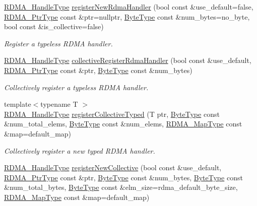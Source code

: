 \begin{DoxyCompactItemize}
\hyperlink{namespacevt_a10442579ec4e7ebef223818e64bcf908}{R\+D\+M\+A\+\_\+\+Handle\+Type} \hyperlink{structvt_1_1rdma_1_1_r_d_m_a_manager_ab68308f4b3b72714f81a00755736b0b5}{register\+New\+Rdma\+Handler} (bool const \&use\+\_\+default=false, \hyperlink{namespacevt_a9e2c953286c7616f7c218e9951790776}{R\+D\+M\+A\+\_\+\+Ptr\+Type} const \&ptr=nullptr, \hyperlink{namespacevt_aab8d55968084610ce3b17057981e9300}{Byte\+Type} const \&num\+\_\+bytes=no\+\_\+byte, bool const \&is\+\_\+collective=false)
\begin{DoxyCompactList}\small\item\em Register a typeless R\+D\+MA handler. \end{DoxyCompactList}\item 
\hyperlink{namespacevt_a10442579ec4e7ebef223818e64bcf908}{R\+D\+M\+A\+\_\+\+Handle\+Type} \hyperlink{structvt_1_1rdma_1_1_r_d_m_a_manager_a526b7c441125a9d5ed9528736be97819}{collective\+Register\+Rdma\+Handler} (bool const \&use\+\_\+default, \hyperlink{namespacevt_a9e2c953286c7616f7c218e9951790776}{R\+D\+M\+A\+\_\+\+Ptr\+Type} const \&ptr, \hyperlink{namespacevt_aab8d55968084610ce3b17057981e9300}{Byte\+Type} const \&num\+\_\+bytes)
\begin{DoxyCompactList}\small\item\em Collectively register a typeless R\+D\+MA handler. \end{DoxyCompactList}\item 
{\footnotesize template$<$typename T $>$ }\\\hyperlink{namespacevt_a10442579ec4e7ebef223818e64bcf908}{R\+D\+M\+A\+\_\+\+Handle\+Type} \hyperlink{structvt_1_1rdma_1_1_r_d_m_a_manager_ad851bdc250182163eb4996888ba1b863}{register\+Collective\+Typed} (T ptr, \hyperlink{namespacevt_aab8d55968084610ce3b17057981e9300}{Byte\+Type} const \&num\+\_\+total\+\_\+elems, \hyperlink{namespacevt_aab8d55968084610ce3b17057981e9300}{Byte\+Type} const \&num\+\_\+elems, \hyperlink{structvt_1_1rdma_1_1_r_d_m_a_manager_a16e12d11cf7d771df0d3dc6947a4f95c}{R\+D\+M\+A\+\_\+\+Map\+Type} const \&map=default\+\_\+map)
\begin{DoxyCompactList}\small\item\em Collectively register a new typed R\+D\+MA handler. \end{DoxyCompactList}\item 
\hyperlink{namespacevt_a10442579ec4e7ebef223818e64bcf908}{R\+D\+M\+A\+\_\+\+Handle\+Type} \hyperlink{structvt_1_1rdma_1_1_r_d_m_a_manager_a339763a690f218c3df58268a691ecfe4}{register\+New\+Collective} (bool const \&use\+\_\+default, \hyperlink{namespacevt_a9e2c953286c7616f7c218e9951790776}{R\+D\+M\+A\+\_\+\+Ptr\+Type} const \&ptr, \hyperlink{namespacevt_aab8d55968084610ce3b17057981e9300}{Byte\+Type} const \&num\+\_\+bytes, \hyperlink{namespacevt_aab8d55968084610ce3b17057981e9300}{Byte\+Type} const \&num\+\_\+total\+\_\+bytes, \hyperlink{namespacevt_aab8d55968084610ce3b17057981e9300}{Byte\+Type} const \&elm\+\_\+size=rdma\+\_\+default\+\_\+byte\+\_\+size, \hyperlink{structvt_1_1rdma_1_1_r_d_m_a_manager_a16e12d11cf7d771df0d3dc6947a4f95c}{R\+D\+M\+A\+\_\+\+Map\+Type} const \&map=default\+\_\+map)

\end{DoxyCompactItemize}
